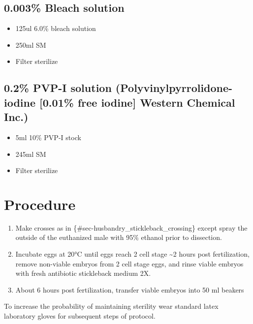 \documentclass[
  letterpaper,
  DIV=11,
  numbers=noendperiod]{scrreprt}
\providecommand{\tightlist}{%
  \setlength{\itemsep}{0pt}\setlength{\parskip}{0pt}}\usepackage{longtable,booktabs,array}
\begin{document}
\hypertarget{bleach-solution}{%
\subsection{0.003\% Bleach solution}\label{bleach-solution}}

\begin{itemize}
\tightlist
\item
  125ul 6.0\% bleach solution
\item
  250ml SM
\item
  Filter sterilize
\end{itemize}

\hypertarget{pvp-i-solution-polyvinylpyrrolidone-iodine-0.01-free-iodine-western-chemical-inc.}{%
\subsection{0.2\% PVP-I solution (Polyvinylpyrrolidone-iodine {[}0.01\%
free iodine{]} Western Chemical
Inc.)}\label{pvp-i-solution-polyvinylpyrrolidone-iodine-0.01-free-iodine-western-chemical-inc.}}

\begin{itemize}
\tightlist
\item
  5ml 10\% PVP-I stock
\item
  245ml SM
\item
  Filter sterilize
\end{itemize}

\hypertarget{procedure-71}{%
\section{Procedure}\label{procedure-71}}

\begin{enumerate}
\def\labelenumi{\arabic{enumi}.}
\tightlist
\item
  Make crosses as in \{\#sec-husbandry\_stickleback\_crossing\} except
  spray the outside of the euthanized male with 95\% ethanol prior to
  dissection.
\item
  Incubate eggs at 20°C until eggs reach 2 cell stage \textasciitilde2
  hours post fertilization, remove non-viable embryos from 2 cell stage
  eggs, and rinse viable embryos with fresh antibiotic stickleback
  medium 2X.
\item
  About 6 hours post fertilization, transfer viable embryos into 50 ml
  beakers
\end{enumerate}

\begin{tcolorbox}[enhanced jigsaw, toprule=.15mm, breakable, coltitle=black, leftrule=.75mm, title=\textcolor{quarto-callout-note-color}{\faInfo}\hspace{0.5em}{NOTES}, bottomrule=.15mm, toptitle=1mm, bottomtitle=1mm, colframe=quarto-callout-note-color-frame, opacityback=0, colback=white, opacitybacktitle=0.6, colbacktitle=quarto-callout-note-color!10!white, rightrule=.15mm, titlerule=0mm, arc=.35mm, left=2mm]

To increase the probability of maintaining sterility wear standard latex
laboratory gloves for subsequent steps of protocol.

\end{tcolorbox}
\end{document}
